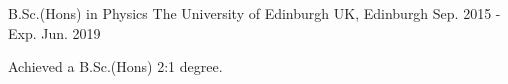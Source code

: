 

\begin{cventries}

  \cventry
    {B.Sc.(Hons) in Physics} %
    {The University of Edinburgh} %
    {UK, Edinburgh} %
    {Sep. 2015 - Exp. Jun. 2019} %
    {
      \begin{cvitems} %
        \item {Achieved a B.Sc.(Hons) 2:1 degree.}
      \end{cvitems}
    }
    

\end{cventries}
